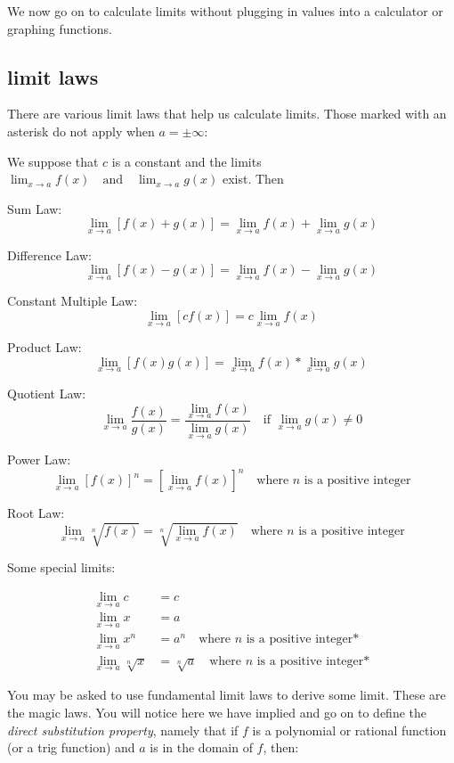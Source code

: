 \documentclass[10pt,a4paper]{report}
\begin{document}
We now go on to calculate limits without plugging in values into a calculator or graphing functions.

\subsection{limit laws}

There are various limit laws that help us calculate limits. Those marked with an asterisk do not apply when $a = \pm \infty$:

We suppose that $c$ is a constant and the limits $\lim_{x \to a} f(x) \quad \text{and} \quad \lim_{x \to a} g(x)$ exist. Then

Sum Law:
$$
	\lim_{x \to a} [ f(x) + g(x) ] = \lim_{x \to a} f(x) + \lim_{x \to a} g(x) 
$$

Difference Law:
$$
	\lim_{x \to a} [ f(x) - g(x) ] = \lim_{x \to a} f(x) - \lim_{x \to a} g(x) 
$$

Constant Multiple Law:
$$
	\lim_{x \to a} [ cf(x) ] = c \lim_{x \to a} f(x)
$$

Product Law:
$$
	\lim_{x \to a} [ f(x) g(x) ] = \lim_{x \to a} f(x) * \lim_{x \to a} g(x)
$$

Quotient Law:
$$
	\lim_{x \to a} \frac{f(x)}{g(x)} = \frac{\lim_{x \to a} f(x)}{\lim_{x \to a} g(x)} \quad \text{if } \lim_{x \to a} g(x) \ne 0
$$

Power Law:
$$
	\lim_{x \to a} [ f(x) ]^n = [\lim_{x \to a} f(x)]^n \quad \text{where } n \text{ is a positive integer}
$$

Root Law:
$$
	\lim_{x \to a} \sqrt[n]{f(x)} = \sqrt[n]{\lim_{x \to a} f(x)} \quad \text{where } n \text{ is a positive integer}
$$

Some special limits:

\begin{align*}
	\lim_{x \to a} c &= c \\
	\lim_{x \to a} x &= a \\
	\lim_{x \to a} x^n &= a^n \quad \text{where } n \text{ is a positive integer*} \\
	\lim_{x \to a} \sqrt[n]{x} &= \sqrt[n]{a} \quad \text{where } n \text{ is a positive integer*}
\end{align*}

You may be asked to use fundamental limit laws to derive some limit. These are the magic laws. You will notice here we have implied and go on to define the \emph{direct substitution property}, namely that if $f$ is a polynomial or rational function (or a trig function) and $a$ is in the domain of $f$, then:
\end{document}
